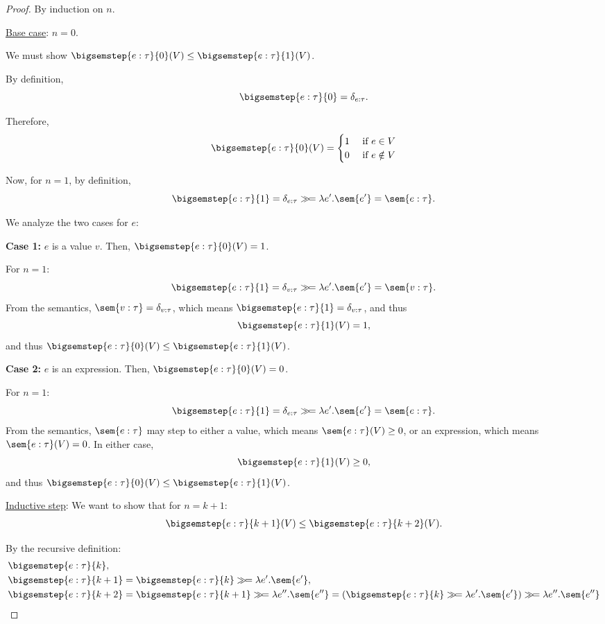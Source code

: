\begin{proof}
	By induction on $n$.

	\underline{Base case}: $n=0$.

	We must show $\bigsemstep{e : \tau}{0}(V) \leq \bigsemstep{e : \tau}{1}(V)$.

	By definition,
	\[
		\bigsemstep{e : \tau}{0} = \delta_{e : \tau}.
	\]

	Therefore,
	\[
		\bigsemstep{e : \tau}{0}(V) =
		\begin{cases}
			1 &\text{ if } e \in V \\
			0 &\text{ if } e \notin V
		\end{cases}
	\]

	Now, for $n=1$, by definition,
	\[
		\bigsemstep{e : \tau}{1} = \delta_{e : \tau} \gg\!= \lambda e'.\sem{e'} = \sem{e : \tau}.
	\]

	We analyze the two cases for $e$:

	\textbf{Case 1:} $e$ is a value $v$. Then, $\bigsemstep{e : \tau}{0}(V) = 1$.

	For $n=1$:
	\[
		\bigsemstep{e : \tau}{1} = \delta_{v : \tau} \gg\!= \lambda e'.\sem{e'} = \sem{v : \tau}.
	\]
	From the semantics, $\sem{v : \tau} = \delta_{v : \tau}$, which means $\bigsemstep{e : \tau}{1} = \delta_{v : \tau}$, and thus
	\[
		\bigsemstep{e : \tau}{1}(V) = 1,
	\]
	and thus $\bigsemstep{e : \tau}{0}(V) \leq \bigsemstep{e : \tau}{1}(V)$.

	\textbf{Case 2:} $e$ is an expression. Then, $\bigsemstep{e : \tau}{0}(V) = 0$.

	For $n=1$:
	\[
		\bigsemstep{e : \tau}{1} = \delta_{e : \tau} \gg\!= \lambda e'.\sem{e'} = \sem{e : \tau}.
	\]
	From the semantics, $\sem{e : \tau}$ may step to either a value, which means $\sem{e : \tau}(V) \geq 0$, or an expression, which means $\sem{e : \tau}(V) = 0$. In either case, 
	\[
		\bigsemstep{e : \tau}{1}(V) \geq 0,
	\]
	and thus $\bigsemstep{e : \tau}{0}(V) \leq \bigsemstep{e : \tau}{1}(V)$.

	\underline{Inductive step}:
	We want to show that for $n = k+1$:
	\begin{align*}
		\bigsemstep{e : \tau}{k+1}(V) \leq \bigsemstep{e : \tau}{k+2}(V).
	\end{align*}

	By the recursive definition:
	\begin{align*}
		&\bigsemstep{e : \tau}{k}, \\
		&\bigsemstep{e : \tau}{k+1} = \bigsemstep{e : \tau}{k} \gg\!= \lambda e'.\sem{e'}, \\
		&\bigsemstep{e : \tau}{k+2} = \bigsemstep{e : \tau}{k+1} \gg\!= \lambda e''.\sem{e''} = (\bigsemstep{e : \tau}{k} \gg\!= \lambda e'.\sem{e'}) \gg\!= \lambda e''.\sem{e''}
	\end{align*}


\end{proof}
